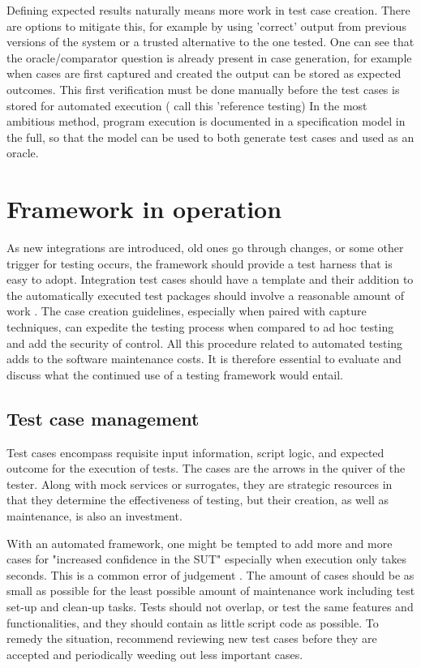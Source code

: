 \documentclass[12pt,a4paper,oneside,pdftex]{report}
\begin{document}
Defining expected results naturally means more work in test case creation. There are options to mitigate this, for example by using 'correct' output from previous versions of the system or a trusted alternative to the one tested. One can see that the oracle/comparator question is already present in case generation, for example when cases are first captured and created the output can be stored as expected outcomes. This first verification must be done manually before the test cases is stored for automated execution (\citet{fewster1999software} call this 'reference testing) In the most ambitious method, program execution is documented in a specification model in the full, so that the model can be used to both generate test cases and used as an oracle. \citep{pezze2008software}

\section{Framework in operation}

As new integrations are introduced, old ones go through changes, or some other trigger for testing occurs, the framework should provide a test harness that is easy to adopt. Integration test cases should have a template and their addition to the automatically executed test packages should involve a reasonable amount of work \citep{fewster1999software}. The case creation guidelines, especially when paired with capture techniques, can expedite the testing process when compared to ad hoc testing and add the security of control. All this procedure related to automated testing adds to the software maintenance costs. It is therefore essential to evaluate and discuss what the continued use of a testing framework would entail.

\subsection{Test case management}
Test cases encompass requisite input information, script logic, and expected outcome for the execution of tests. The cases are the arrows in the quiver of the tester. Along with mock services or surrogates, they are strategic resources in that they determine the effectiveness of testing, but their creation, as well as maintenance, is also an investment.

With an automated framework, one might be tempted to add more and more cases for "increased confidence in the SUT" especially when execution only takes seconds. This is a common error of judgement \citep{fewster1999software}. The amount of cases should be as small as possible for the least possible amount of maintenance work including test set-up and clean-up tasks. Tests should not overlap, or test the same features and functionalities, and they should contain as little script code as possible. To remedy the situation, \citet{fewster1999software} recommend reviewing new test cases before they are accepted and periodically weeding out less important cases. 
\end{document}
